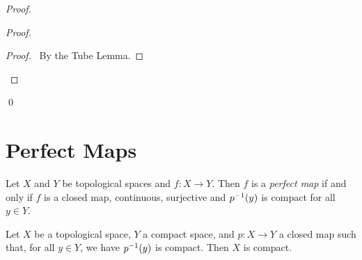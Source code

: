 \begin{proof}
    \pf
    \begin{proof}
        \begin{proof}
            \pf\ By the Tube Lemma.
        \end{proof}
    \end{proof}
    \qed
\end{proof}

\section{Perfect Maps}

\begin{definition}
    Let $X$ and $Y$ be topological spaces and $f : X \rightarrow Y$. Then $f$ is a \emph{perfect map} if and only if $f$ is a closed map, continuous,
    surjective and ${p}^{-1}(y)$ is compact for all $y \in Y$.
\end{definition}

\begin{proposition}
    \label{proposition:compact_pre_image}
    Let $X$ be a topological space, $Y$ a compact space, and $p : X \rightarrow Y$ a closed map such that, for all $y \in Y$, we have ${p}^{-1}(y)$ is compact. Then $X$ is compact.
\end{proposition}

